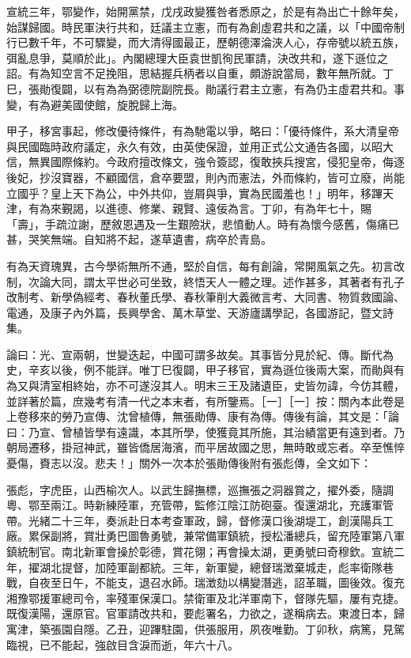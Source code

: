 \begin{pinyinscope}
宣統三年，鄂變作，始開黨禁，戊戌政變獲咎者悉原之，於是有為出亡十餘年矣，始謀歸國。時民軍決行共和，廷議主立憲，而有為創虛君共和之議，以「中國帝制行已數千年，不可驟變，而大清得國最正，歷朝德澤淪浹人心，存帝號以統五族，弭亂息爭，莫順於此」。內閣總理大臣袁世凱徇民軍請，決改共和，遂下遜位之詔。有為知空言不足挽阻，思結握兵柄者以自重，頗游說當局，數年無所就。丁巳，張勛復闢，以有為為弼德院副院長。勛議行君主立憲，有為仍主虛君共和。事變，有為避美國使館，旋脫歸上海。

甲子，移宮事起，修改優待條件，有為馳電以爭，略曰：「優待條件，系大清皇帝與民國臨時政府議定，永久有效，由英使保證，並用正式公文通告各國，以昭大信，無異國際條約。今政府擅改條文，強令簽認，復敢挾兵搜宮，侵犯皇帝，侮逐後妃，抄沒寶器，不顧國信，倉卒要盟，則內而憲法，外而條約，皆可立廢，尚能立國乎？皇上天下為公，中外共仰，豈屑與爭，實為民國羞也！」明年，移蹕天津，有為來覲謁，以進德、修業、親賢、遠佞為言。丁卯，有為年七十，賜「壽」，手疏泣謝，歷敘恩遇及一生艱險狀，悲憤動人。時有為懷今感舊，傷痛已甚，哭笑無端。自知將不起，遂草遺書，病卒於青島。

有為天資瑰異，古今學術無所不通，堅於自信，每有創論，常開風氣之先。初言改制，次論大同，謂太平世必可坐致，終悟天人一體之理。述作甚多，其著者有孔子改制考、新學偽經考、春秋董氏學、春秋筆削大義微言考、大同書、物質救國論、電通，及康子內外篇，長興學舍、萬木草堂、天游廬講學記，各國游記，暨文詩集。

論曰：光、宣兩朝，世變迭起，中國可謂多故矣。其事皆分見於紀、傳。斷代為史，辛亥以後，例不能詳。唯丁巳復闢，甲子移官，實為遜位後兩大案，而勛與有為又與清室相終始，亦不可遂沒其人。明末三王及諸遺臣，史皆勿諱，今仿其體，並詳著於篇，庶幾考有清一代之本末者，有所鑒焉。［一］［一］按：關內本此卷是上卷移來的勞乃宣傳、沈曾植傳，無張勛傳、康有為傳。傳後有論，其文是：「論曰：乃宣、曾植皆學有遠識，本其所學，使獲竟其所施，其治績當更有遠到者。乃朝局遷移，掛冠神武，雖皆僑居海濱，而平居故國之思，無時敢或忘者。卒至憔悴憂傷，賚志以沒。悲夫！」關外一次本於張勛傳後附有張彪傳，全文如下：

張彪，字虎臣，山西榆次人。以武生歸撫標，巡撫張之洞器賞之，擢外委，隨調粵、鄂至兩江。時新練陸軍，充管帶，監修江陰江防砲臺。復還湖北，充護軍管帶。光緒二十三年，奏派赴日本考查軍政，歸，督修漢口後湖堤工，創漢陽兵工廠。累保副將，賞壯勇巴圖魯勇號，兼常備軍鎮統，授松潘總兵，留充陸軍第八軍鎮統制官。南北新軍會操於彰德，賞花翎；再會操太湖，更勇號曰奇穆欽。宣統二年，擢湖北提督，加陸軍副都統。三年，新軍變，總督瑞澂棄城走，彪率衛隊巷戰，自夜至日午，不能支，退召水師。瑞澂劾以構變潛逃，詔革職，圖後效。復充湘豫鄂援軍總司令，率殘軍保漢口。禁衛軍及北洋軍南下，督隊先驅，屢有克捷。既復漢陽，還原官。官軍請改共和，要彪署名，力欲之，遂稱病去。東渡日本，歸寓津，築張園自隱。乙丑，迎蹕駐園，供張服用，夙夜唯勤。丁卯秋，病篤，見駕臨視，已不能起，強啟目含淚而逝，年六十八。


\end{pinyinscope}